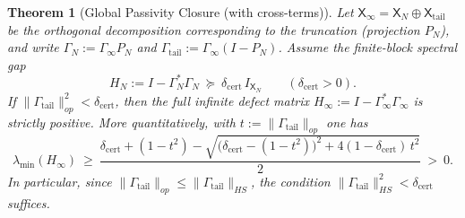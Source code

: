\documentclass[11pt]{article}
\newtheorem{theorem}{Theorem}
\theoremstyle{definition}
\theoremstyle{remark}
\theoremstyle{definition}
\begin{document}
\begin{theorem}[Global Passivity Closure (with cross-terms)]\label{thm:global-passivity}
Let $\mathsf X_\infty=\mathsf X_N\oplus \mathsf X_{\mathrm{tail}}$ be the orthogonal decomposition corresponding to the truncation (projection $P_N$), and write
$\Gamma_N:=\Gamma_\infty P_N$ and $\Gamma_{\mathrm{tail}}:=\Gamma_\infty(I-P_N)$.
Assume the finite-block spectral gap
\[
  H_N:=I-\Gamma_N^*\Gamma_N\ \succeq\ \delta_{\mathrm{cert}}\,I_{\mathsf X_N}
  \qquad(\delta_{\mathrm{cert}}>0).
\]
If $\|\Gamma_{\mathrm{tail}}\|_{op}^2<\delta_{\mathrm{cert}}$, then the full infinite defect matrix
$H_\infty:=I-\Gamma_\infty^*\Gamma_\infty$ is strictly positive.
More quantitatively, with $t:=\|\Gamma_{\mathrm{tail}}\|_{op}$ one has
\begin{equation}\label{eq:global-passivity-lower-bound}
  \lambda_{\min}(H_\infty)\ \ge\ 
  \frac{\delta_{\mathrm{cert}}+(1-t^2)-\sqrt{\big(\delta_{\mathrm{cert}}-(1-t^2)\big)^2+4(1-\delta_{\mathrm{cert}})\,t^2}}{2}\ >\ 0.
\end{equation}
In particular, since $\|\Gamma_{\mathrm{tail}}\|_{op}\le \|\Gamma_{\mathrm{tail}}\|_{HS}$, the condition $\|\Gamma_{\mathrm{tail}}\|_{HS}^2<\delta_{\mathrm{cert}}$ suffices.
\end{theorem}
\end{document}
